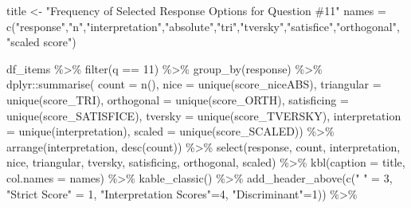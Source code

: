 \documentclass[
  letterpaper,
  DIV=11,
  numbers=noendperiod]{scrreprt}
\newenvironment{Shaded}{\begin{snugshade}}{\end{snugshade}}
\newcommand{\AttributeTok}[1]{\textcolor[rgb]{0.40,0.45,0.13}{#1}}
\newcommand{\DecValTok}[1]{\textcolor[rgb]{0.68,0.00,0.00}{#1}}
\newcommand{\FunctionTok}[1]{\textcolor[rgb]{0.28,0.35,0.67}{#1}}
\newcommand{\NormalTok}[1]{\textcolor[rgb]{0.00,0.23,0.31}{#1}}
\newcommand{\OtherTok}[1]{\textcolor[rgb]{0.00,0.23,0.31}{#1}}
\newcommand{\SpecialCharTok}[1]{\textcolor[rgb]{0.37,0.37,0.37}{#1}}
\newcommand{\StringTok}[1]{\textcolor[rgb]{0.13,0.47,0.30}{#1}}
\begin{document}
\begin{Shaded}
\begin{Highlighting}[]
\NormalTok{title }\OtherTok{\textless{}{-}} \StringTok{"Frequency of Selected Response Options for Question \#11"}
\NormalTok{names }\OtherTok{=} \FunctionTok{c}\NormalTok{(}\StringTok{"response"}\NormalTok{,}\StringTok{"n"}\NormalTok{,}\StringTok{"interpretation"}\NormalTok{,}\StringTok{"absolute"}\NormalTok{,}\StringTok{"tri"}\NormalTok{,}\StringTok{"tversky"}\NormalTok{,}\StringTok{"satisfice"}\NormalTok{,}\StringTok{"orthogonal"}\NormalTok{, }\StringTok{"scaled score"}\NormalTok{)}

\NormalTok{df\_items }\SpecialCharTok{\%\textgreater{}\%} \FunctionTok{filter}\NormalTok{(q }\SpecialCharTok{==} \DecValTok{11}\NormalTok{) }\SpecialCharTok{\%\textgreater{}\%} \FunctionTok{group\_by}\NormalTok{(response) }\SpecialCharTok{\%\textgreater{}\%}
\NormalTok{  dplyr}\SpecialCharTok{::}\FunctionTok{summarise}\NormalTok{( }\AttributeTok{count =} \FunctionTok{n}\NormalTok{(),}
                    \AttributeTok{nice =} \FunctionTok{unique}\NormalTok{(score\_niceABS),}
                    \AttributeTok{triangular =} \FunctionTok{unique}\NormalTok{(score\_TRI),}
                    \AttributeTok{orthogonal =}  \FunctionTok{unique}\NormalTok{(score\_ORTH),}
                    \AttributeTok{satisficing =}  \FunctionTok{unique}\NormalTok{(score\_SATISFICE),}
                    \AttributeTok{tversky =} \FunctionTok{unique}\NormalTok{(score\_TVERSKY),}
                    \AttributeTok{interpretation =} \FunctionTok{unique}\NormalTok{(interpretation),}
                    \AttributeTok{scaled =} \FunctionTok{unique}\NormalTok{(score\_SCALED)) }\SpecialCharTok{\%\textgreater{}\%}
  \FunctionTok{arrange}\NormalTok{(interpretation, }\FunctionTok{desc}\NormalTok{(count)) }\SpecialCharTok{\%\textgreater{}\%}
  \FunctionTok{select}\NormalTok{(response, count, interpretation, nice,}
\NormalTok{         triangular, tversky, satisficing, orthogonal, scaled) }\SpecialCharTok{\%\textgreater{}\%}
  \FunctionTok{kbl}\NormalTok{(}\AttributeTok{caption =}\NormalTok{ title, }\AttributeTok{col.names =}\NormalTok{ names) }\SpecialCharTok{\%\textgreater{}\%}  \FunctionTok{kable\_classic}\NormalTok{() }\SpecialCharTok{\%\textgreater{}\%}
  \FunctionTok{add\_header\_above}\NormalTok{(}\FunctionTok{c}\NormalTok{(}\StringTok{" "} \OtherTok{=} \DecValTok{3}\NormalTok{, }\StringTok{"Strict Score"} \OtherTok{=} \DecValTok{1}\NormalTok{, }\StringTok{"Interpretation Scores"}\OtherTok{=}\DecValTok{4}\NormalTok{, }\StringTok{"Discriminant"}\OtherTok{=}\DecValTok{1}\NormalTok{)) }\SpecialCharTok{\%\textgreater{}\%}

\end{Highlighting}
\end{Shaded}
\end{document}
